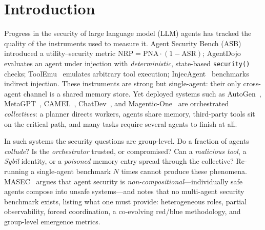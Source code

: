 \section{Introduction}
\label{sec:intro}

Progress in the security of large language model (LLM) agents has tracked the quality of
the instruments used to measure it. Agent Security Bench
(ASB)~\cite{zhang2025asb} introduced a utility--security metric
$\mathrm{NRP}=\mathrm{PNA}\cdot(1-\mathrm{ASR})$; AgentDojo~\cite{debenedetti2024agentdojo}
evaluates an agent under injection with \emph{deterministic}, state-based
\texttt{security()} checks; ToolEmu~\cite{ruan2024toolemu} emulates arbitrary tool
execution; InjecAgent~\cite{zhan2024injecagent} benchmarks indirect injection. These
instruments are strong but single-agent: their only cross-agent channel is a shared memory
store. Yet deployed systems such as AutoGen~\cite{wu2023autogen},
MetaGPT~\cite{hong2023metagpt}, CAMEL~\cite{li2023camel},
ChatDev~\cite{qian2024chatdev}, and Magentic-One~\cite{fourney2024magenticone} are
orchestrated \emph{collectives}: a planner directs workers, agents share memory,
third-party tools sit on the critical path, and many tasks require several agents to
finish at all.

In such systems the security questions are group-level. Do a fraction of agents
\emph{collude}? Is the \emph{orchestrator} trusted, or compromised? Can a \emph{malicious
tool}, a \emph{Sybil} identity, or a \emph{poisoned} memory entry spread through the
collective? Re-running a single-agent benchmark $N$ times cannot produce these phenomena.
MASEC~\cite{schroederdewitt2025masec} argues that agent security is
\emph{non-compositional}---individually safe agents compose into unsafe systems---and
notes that no multi-agent security benchmark exists, listing what one must provide:
heterogeneous roles, partial observability, forced coordination, a co-evolving red/blue
methodology, and group-level emergence metrics.


